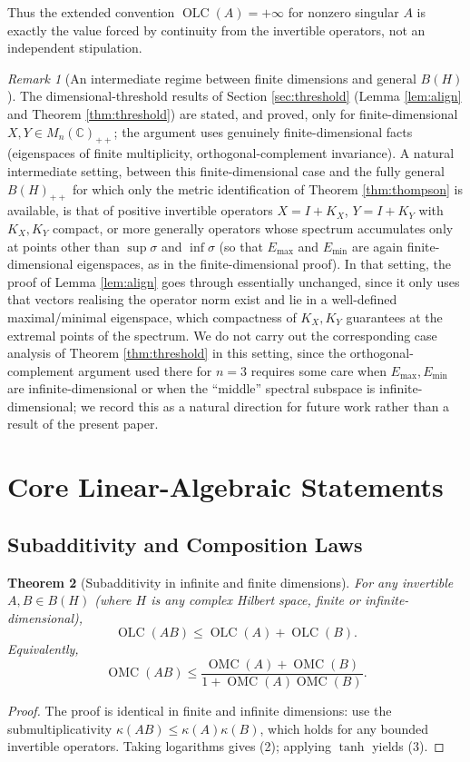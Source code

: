 \documentclass{article}
\newtheorem{theorem}{Theorem}[section]
\theoremstyle{remark}
\newtheorem{remark}[theorem]{Remark}
\providecommand{\QLC}{\operatorname{OLC}}
\providecommand{\QMC}{\operatorname{OMC}}
\providecommand{\Emax}{E_{\max}}
\providecommand{\Emin}{E_{\min}}
\begin{document}
Thus the extended convention $\QLC(A)=+\infty$ for nonzero singular $A$ is exactly the value forced by continuity from the invertible operators, not an independent stipulation.

\begin{remark}[An intermediate regime between finite dimensions and general $B(H)$]\label{rem:infinite-dim}
The dimensional-threshold results of Section \ref{sec:threshold} (Lemma \ref{lem:align} and Theorem \ref{thm:threshold}) are stated, and proved, only for finite-dimensional $X,Y\in M_n(\mathbb{C})_{++}$; the argument uses genuinely finite-dimensional facts (eigenspaces of finite multiplicity, orthogonal-complement invariance). A natural intermediate setting, between this finite-dimensional case and the fully general $B(H)_{++}$ for which only the metric identification of Theorem \ref{thm:thompson} is available, is that of positive invertible operators $X=I+K_X$, $Y=I+K_Y$ with $K_X,K_Y$ compact, or more generally operators whose spectrum accumulates only at points other than $\sup\sigma$ and $\inf\sigma$ (so that $\Emax$ and $\Emin$ are again finite-dimensional eigenspaces, as in the finite-dimensional proof). In that setting, the proof of Lemma \ref{lem:align} goes through essentially unchanged, since it only uses that vectors realising the operator norm exist and lie in a well-defined maximal/minimal eigenspace, which compactness of $K_X,K_Y$ guarantees at the extremal points of the spectrum. We do not carry out the corresponding case analysis of Theorem \ref{thm:threshold} in this setting, since the orthogonal-complement argument used there for $n=3$ requires some care when $\Emax,\Emin$ are infinite-dimensional or when the ``middle'' spectral subspace is infinite-dimensional; we record this as a natural direction for future work rather than a result of the present paper.
\end{remark}


\section{Core Linear-Algebraic Statements}

\subsection{Subadditivity and Composition Laws}

\begin{theorem}[Subadditivity in infinite and finite dimensions]\label{thm:subadd}
For any invertible $A,B\in B(H)$ (where $H$ is any complex Hilbert space, finite or infinite-dimensional),
\[
\QLC(AB) \le \QLC(A)+\QLC(B). \tag{2}
\]
Equivalently,
\[
\QMC(AB) \le \frac{\QMC(A)+\QMC(B)}{1+\QMC(A)\QMC(B)}. \tag{3}
\]
\end{theorem}
\begin{proof}
The proof is identical in finite and infinite dimensions: use the submultiplicativity $\kappa(AB)\le\kappa(A)\kappa(B)$, which holds for any bounded invertible operators. Taking logarithms gives (2); applying $\tanh$ yields (3).
\end{proof}
\end{document}
